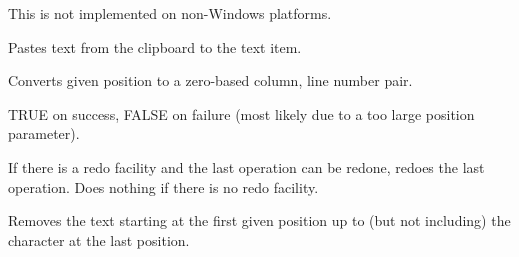 This is not implemented on non-Windows platforms.



\label{wxtextctrlpaste}


Pastes text from the clipboard to the text item.

\label{wxtextctrlpositiontoxy}


Converts given position to a zero-based column, line number pair.






TRUE on success, FALSE on failure (most likely due to a too large position
parameter).




\label{wxtextctrlredo}


If there is a redo facility and the last operation can be redone, redoes the last operation. Does nothing
if there is no redo facility.

\label{wxtextctrlremove}


Removes the text starting at the first given position up to (but not including)
the character at the last position.




